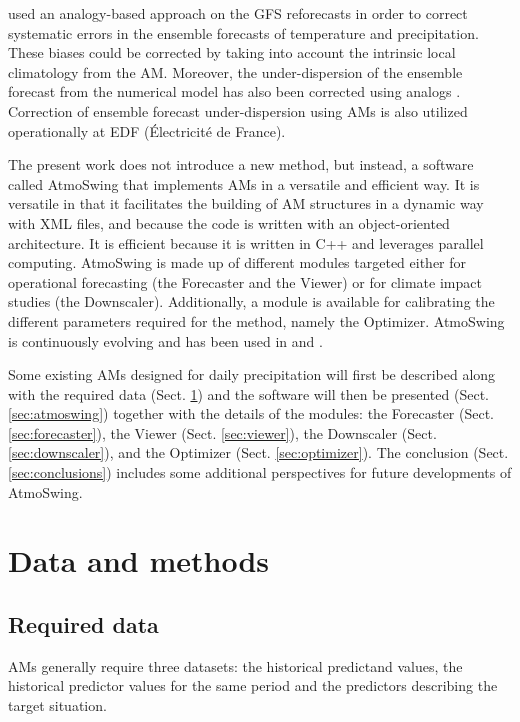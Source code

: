\documentclass[gmd]{copernicus}
\begin{document}
\citet{Hamill2006} used an analogy-based approach on the GFS reforecasts in order to correct systematic errors in the ensemble forecasts of temperature and precipitation. These biases could be corrected by taking into account the intrinsic local climatology from the AM. Moreover, the under-dispersion of the ensemble forecast from the numerical model has also been corrected using analogs \citep{Hamill2006}. Correction of ensemble forecast under-dispersion using AMs is also utilized operationally at EDF (\'{E}lectricit\'{e} de France).

The present work does not introduce a new method, but instead, a software called AtmoSwing that implements AMs in a versatile and efficient way. It is versatile in that it facilitates the building of AM structures in a dynamic way with XML files, and because the code is written with an object-oriented architecture. It is efficient because it is written in C++ and leverages parallel computing. AtmoSwing is made up of different modules targeted either for operational forecasting (the Forecaster and the Viewer) or for climate impact studies (the Downscaler). Additionally, a module is available for calibrating the different parameters required for the method, namely the Optimizer. AtmoSwing is continuously evolving and has been used in \citet{Horton2012, Horton2017a, Horton2017b, Horton2018a} and \citet{Horton2018b}.

Some existing AMs designed for daily precipitation will first be described along with the required data (Sect. \ref{sec:data_methods}) and the software will then be presented (Sect. \ref{sec:atmoswing}) together with the details of the modules: the Forecaster (Sect. \ref{sec:forecaster}), the Viewer (Sect. \ref{sec:viewer}), the Downscaler (Sect. \ref{sec:downscaler}), and the Optimizer (Sect. \ref{sec:optimizer}). The conclusion (Sect. \ref{sec:conclusions}) includes some additional perspectives for future developments of AtmoSwing. 


\section{Data and methods}
\label{sec:data_methods}


\subsection{Required data}
\label{sec:data}

AMs generally require three datasets: the historical predictand values, the historical predictor values for the same period and the predictors describing the target situation.
\end{document}
